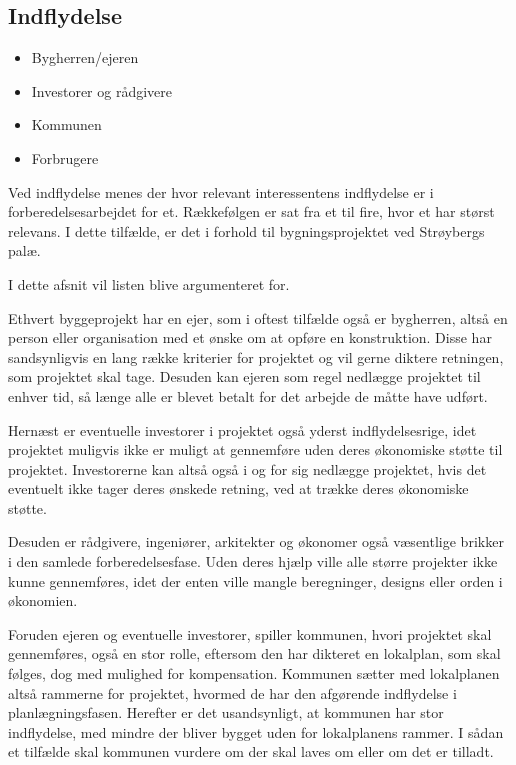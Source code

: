 \subsection{Indflydelse}

\begin{itemize}
\item Bygherren/ejeren
\item Investorer og rådgivere
\item Kommunen
\item Forbrugere
\end{itemize}

Ved indflydelse menes der hvor relevant interessentens indflydelse er i forberedelsesarbejdet for et. Rækkefølgen er sat fra et til fire, hvor et har størst relevans. I dette tilfælde, er det i forhold til bygningsprojektet ved Strøybergs palæ.

I dette afsnit vil listen blive argumenteret for.

Ethvert byggeprojekt har en ejer, som i oftest tilfælde også er bygherren, altså en person eller organisation med et ønske om at opføre en konstruktion. Disse har sandsynligvis en lang række kriterier for projektet og vil gerne diktere retningen, som projektet skal tage. Desuden kan ejeren som regel nedlægge projektet til enhver tid, så længe alle er blevet betalt for det arbejde de måtte have udført. 

Hernæst er eventuelle investorer i projektet også yderst indflydelsesrige, idet projektet muligvis ikke er muligt at gennemføre uden deres økonomiske støtte til projektet. Investorerne kan altså også i og for sig nedlægge projektet, hvis det eventuelt ikke tager deres ønskede retning, ved at trække deres økonomiske støtte.

Desuden er rådgivere, ingeniører, arkitekter og økonomer også væsentlige brikker i den samlede forberedelsesfase. Uden deres hjælp ville alle større projekter ikke kunne gennemføres, idet der enten ville mangle beregninger, designs eller orden i økonomien.

Foruden ejeren og eventuelle investorer, spiller kommunen, hvori projektet skal gennemføres, også en stor rolle, eftersom den har dikteret en lokalplan, som skal følges, dog med mulighed for kompensation. Kommunen sætter med lokalplanen altså rammerne for projektet, hvormed de har den afgørende indflydelse i planlægningsfasen. Herefter er det usandsynligt, at kommunen har stor indflydelse, med mindre der bliver bygget uden for lokalplanens rammer. I sådan et tilfælde skal kommunen vurdere om der skal laves om eller om det er tilladt.
 
